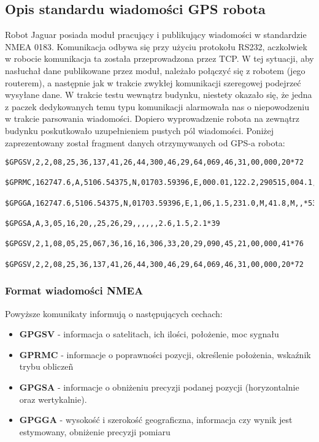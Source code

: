 \subsection{Opis standardu wiadomości GPS robota}
Robot Jaguar posiada moduł pracujący i publikujący wiadomości w standardzie NMEA 0183. Komunikacja odbywa się przy użyciu protokołu RS232, aczkolwiek w robocie komunikacja ta została przeprowadzona przez TCP. W tej sytuacji, aby nasłuchał dane publikowane przez moduł, należało połączyć się z robotem (jego routerem), a następnie jak w trakcie zwykłej komunikacji szeregowej podejrzeć wysyłane dane. W trakcie testu wewnątrz budynku, niestety okazało się, że jedna z paczek dedykowanych temu typu komunikacji alarmowała nas o niepowodzeniu w trakcie parsowania wiadomości. Dopiero wyprowadzenie robota na zewnątrz budynku poskutkowało uzupełnieniem pustych pól wiadomości. Poniżej zaprezentowany został fragment danych otrzymywanych od GPS-a robota:
\begin{verbatim}
$GPGSV,2,2,08,25,36,137,41,26,44,300,46,29,64,069,46,31,00,000,20*72

$GPRMC,162747.6,A,5106.54375,N,01703.59396,E,000.01,122.2,290515,004.1,E*55

$GPGGA,162747.6,5106.54375,N,01703.59396,E,1,06,1.5,231.0,M,41.8,M,,*53

$GPGSA,A,3,05,16,20,,25,26,29,,,,,,2.6,1.5,2.1*39

$GPGSV,2,1,08,05,25,067,36,16,16,306,33,20,29,090,45,21,00,000,41*76

$GPGSV,2,2,08,25,36,137,41,26,44,300,46,29,64,069,46,31,00,000,20*72
\end{verbatim}

\subsubsection{Format wiadomości NMEA}
Powyższe komunikaty informują o następujących cechach:
\begin{itemize}
\item \textbf{GPGSV} - informacja o satelitach, ich ilości, położenie, moc sygnału
\item \textbf{GPRMC} - informacje o poprawności pozycji, określenie położenia, wskaźnik trybu obliczeñ
\item \textbf{GPGSA} - informacje o obniżeniu precyzji podanej pozycji (horyzontalnie oraz wertykalnie).
\item \textbf{GPGGA} - wysokość i szerokość geograficzna, informacja czy wynik jest estymowany, obniżenie precyzji pomiaru
\end{itemize}


